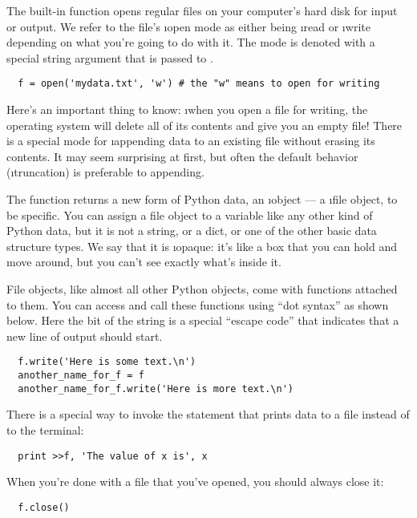 \documentclass[letterpaper, 12pt, titlepage, twoside]{article}
\begin{document}
The built-in  function opens regular files on your computer's hard
disk for input or output. We refer to the file's \i{open mode} as either being
\i{read} or \i{write} depending on what you're going to do with it. The mode
is denoted with a special string argument that is passed to .

\begin{lstlisting}
  f = open('mydata.txt', 'w') # the "w" means to open for writing
\end{lstlisting}

Here's an important thing to know: \i{when you open a file for writing, the
  operating system will delete all of its contents and give you an empty
  file!} There is a special  mode for \i{appending} data to an existing
file without erasing its contents. It may seem surprising at first, but often
the default behavior (\i{truncation}) is preferable to appending.

The  function returns a new form of Python data, an \i{object} --- a
\i{file object}, to be specific. You can assign a file object to a variable
like any other kind of Python data, but it is not a string, or a dict, or one
of the other basic data structure types. We say that it is \i{opaque}: it's
like a box that you can hold and move around, but you can't see exactly what's
inside it.

File objects, like almost all other Python objects, come with functions
attached to them. You can access and call these functions using ``dot syntax''
as shown below. Here the  bit of the string is a special
``escape code'' that indicates that a new line of output should start.

\begin{lstlisting}
  f.write('Here is some text.\n')
  another_name_for_f = f
  another_name_for_f.write('Here is more text.\n')
\end{lstlisting}

There is a special way to invoke the  statement that prints data to a
file instead of to the terminal:

\begin{lstlisting}
  print >>f, 'The value of x is', x
\end{lstlisting}

When you're done with a file that you've opened, you should always close it:

\begin{lstlisting}
  f.close()
\end{lstlisting}
\end{document}
